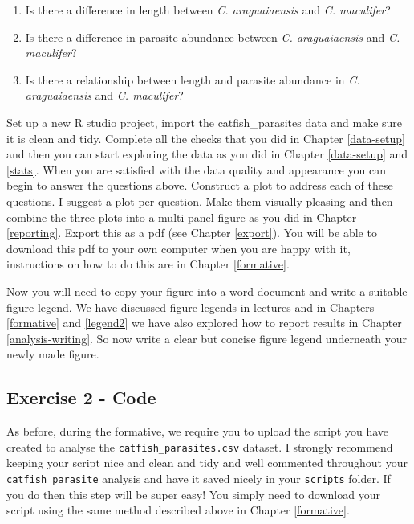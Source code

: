 \documentclass[
]{book}
\providecommand{\tightlist}{%
  \setlength{\itemsep}{0pt}\setlength{\parskip}{0pt}}
\begin{document}
\begin{enumerate}
\def\labelenumi{\arabic{enumi})}
\tightlist
\item
  Is there a difference in length between \emph{C. araguaiaensis} and \emph{C. maculifer}?
\item
  Is there a difference in parasite abundance between \emph{C. araguaiaensis} and \emph{C. maculifer}?
\item
  Is there a relationship between length and parasite abundance in \emph{C. araguaiaensis} and \emph{C. maculifer}?
\end{enumerate}

Set up a new R studio project, import the catfish\_parasites data and make sure it is clean and tidy. Complete all the checks that you did in Chapter \ref{data-setup} and then you can start exploring the data as you did in Chapter \ref{data-setup} and \ref{stats}. When you are satisfied with the data quality and appearance you can begin to answer the questions above. Construct a plot to address each of these questions. I suggest a plot per question. Make them visually pleasing and then combine the three plots into a multi-panel figure as you did in Chapter \ref{reporting}. Export this as a pdf (see Chapter \ref{export}). You will be able to download this pdf to your own computer when you are happy with it, instructions on how to do this are in Chapter \ref{formative}.

Now you will need to copy your figure into a word document and write a suitable figure legend. We have discussed figure legends in lectures and in Chapters \ref{formative} and \ref{legend2} we have also explored how to report results in Chapter \ref{analysis-writing}. So now write a clear but concise figure legend underneath your newly made figure.

\hypertarget{exercise-2---code}{%
\subsection{Exercise 2 - Code}\label{exercise-2---code}}

As before, during the formative, we require you to upload the script you have created to analyse the \texttt{catfish\_parasites.csv} dataset. I strongly recommend keeping your script nice and clean and tidy and well commented throughout your \texttt{catfish\_parasite} analysis and have it saved nicely in your \texttt{scripts} folder. If you do then this step will be super easy! You simply need to download your script using the same method described above in Chapter \ref{formative}.
\end{document}
